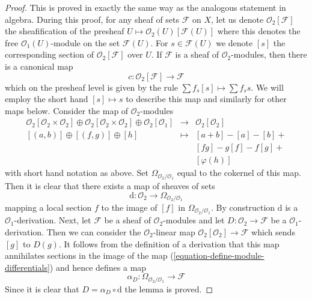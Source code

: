 \begin{proof}
This is proved in exactly the same way as the analogous statement in algebra.
During this proof, for any sheaf of sets $\mathcal{F}$ on $X$,
let us denote $\mathcal{O}_2[\mathcal{F}]$ the sheafification of the
presheaf $U \mapsto \mathcal{O}_2(U)[\mathcal{F}(U)]$ where this denotes
the free $\mathcal{O}_1(U)$-module on the set $\mathcal{F}(U)$.
For $s \in \mathcal{F}(U)$ we denote $[s]$ the corresponding section
of $\mathcal{O}_2[\mathcal{F}]$ over $U$. If $\mathcal{F}$ is a sheaf of
$\mathcal{O}_2$-modules, then there is a canonical map
$$
c : \mathcal{O}_2[\mathcal{F}] \longrightarrow \mathcal{F}
$$
which on the presheaf level is given by the rule
$\sum f_s[s] \mapsto \sum f_s s$. We will employ the short hand
$[s] \mapsto s$ to
describe this map and similarly for other maps below. Consider
the map of $\mathcal{O}_2$-modules
\begin{equation}
\label{equation-define-module-differentials}
\begin{matrix}
\mathcal{O}_2[\mathcal{O}_2 \times \mathcal{O}_2] \oplus
\mathcal{O}_2[\mathcal{O}_2 \times \mathcal{O}_2] \oplus
\mathcal{O}_2[\mathcal{O}_1] &
\longrightarrow &
\mathcal{O}_2[\mathcal{O}_2] \\
[(a, b)] \oplus [(f, g)] \oplus [h] & \longmapsto & [a + b] - [a] - [b] + \\
& & [fg] - g[f] - f[g] + \\
& & [\varphi(h)]
\end{matrix}
\end{equation}
with short hand notation as above. Set $\Omega_{\mathcal{O}_2/\mathcal{O}_1}$
equal to the cokernel of this map. Then it is clear that there exists
a map of sheaves of sets
$$
\text{d} : \mathcal{O}_2 \longrightarrow \Omega_{\mathcal{O}_2/\mathcal{O}_1}
$$
mapping a local section $f$ to the image of $[f]$ in
$\Omega_{\mathcal{O}_2/\mathcal{O}_1}$. By construction $\text{d}$
is a $\mathcal{O}_1$-derivation. Next, let $\mathcal{F}$
be a sheaf of $\mathcal{O}_2$-modules and let
$D : \mathcal{O}_2 \to \mathcal{F}$ be a $\mathcal{O}_1$-derivation.
Then we can consider the $\mathcal{O}_2$-linear map
$\mathcal{O}_2[\mathcal{O}_2] \to \mathcal{F}$ which sends $[g]$ to $D(g)$.
It follows from the definition of a derivation that this map annihilates
sections in the image of the map (\ref{equation-define-module-differentials})
and hence defines a map
$$
\alpha_D : \Omega_{\mathcal{O}_2/\mathcal{O}_1} \longrightarrow \mathcal{F}
$$
Since it is clear that $D = \alpha_D \circ \text{d}$ the lemma is proved.
\end{proof}

